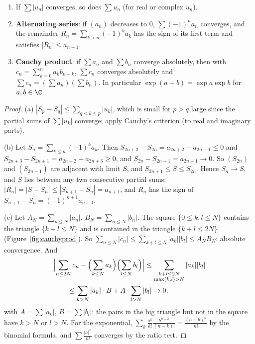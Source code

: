\begin{proposition}\label{prop:signedseries}
\begin{enumerate}[label=(\alph*)]
\item If $\sum|u_n|$ converges, so does $\sum u_n$ (for real or complex $u_n$).
\item \textbf{Alternating series}: if $(a_n)$ decreases to $0$, $\sum(-1)^na_n$ converges, and the remainder $R_n=\sum_{k>n}(-1)^ka_k$ has the sign of its first term and satisfies $|R_n|\le a_{n+1}$.
\item \textbf{Cauchy product}: if $\sum a_n$ and $\sum b_n$ converge absolutely, then with $c_n=\sum_{k=0}^na_kb_{n-k}$, $\sum c_n$ converges absolutely and $\sum c_n=\left(\sum a_n\right)\left(\sum b_n\right)$. In particular $\exp(a+b)=\exp a\exp b$ for $a,b\in\C$.
\end{enumerate}
\end{proposition}
\begin{proof}
(a) $|S_p-S_q|\le\sum_{q<k\le p}|u_k|$, which is small for $p>q$ large since the partial sums of $\sum|u_k|$ converge; apply Cauchy's criterion (to real and imaginary parts).

(b) Let $S_n=\sum_{k\le n}(-1)^ka_k$. Then $S_{2n+2}-S_{2n}=a_{2n+2}-a_{2n+1}\le0$ and $S_{2n+3}-S_{2n+1}=a_{2n+2}-a_{2n+3}\ge0$, and $S_{2n}-S_{2n+1}=a_{2n+1}\to0$. So $(S_{2n})$ and $(S_{2n+1})$ are adjacent with limit $S$, and $S_{2n+1}\le S\le S_{2n}$. Hence $S_n\to S$, and $S$ lies between any two consecutive partial sums: $|R_n|=|S-S_n|\le|S_{n+1}-S_n|=a_{n+1}$, and $R_n$ has the sign of $S_{n+1}-S_n=(-1)^{n+1}a_{n+1}$.

(c) Let $A_N=\sum_{n\le N}|a_n|$, $B_N=\sum_{n\le N}|b_n|$. The square $\{0\le k,l\le N\}$ contains the triangle $\{k+l\le N\}$ and is contained in the triangle $\{k+l\le2N\}$ (Figure~\ref{fig:cauchyprod}). So $\sum_{n\le N}|c_n|\le\sum_{k+l\le N}|a_k||b_l|\le A_NB_N$: absolute convergence. And
\[
\begin{aligned}&\Bigl|\sum_{n\le2N}c_n-\Bigl(\sum_{k\le N}a_k\Bigr)\Bigl(\sum_{l\le N}b_l\Bigr)\Bigr|\le\sum_{\substack{k+l\le2N\\ \max(k,l)>N}}|a_k||b_l|\\&\qquad\le\sum_{k>N}|a_k|\cdot B+A\cdot\sum_{l>N}|b_l|\to0,\end{aligned}
\]
with $A=\sum|a_k|$, $B=\sum|b_l|$: the pairs in the big triangle but not in the square have $k>N$ or $l>N$. For the exponential, $\sum_{k}\frac{a^k}{k!}\frac{b^{n-k}}{(n-k)!}=\frac{(a+b)^n}{n!}$ by the binomial formula, and $\sum\frac{|a|^n}{n!}$ converges by the ratio test.
\end{proof}

